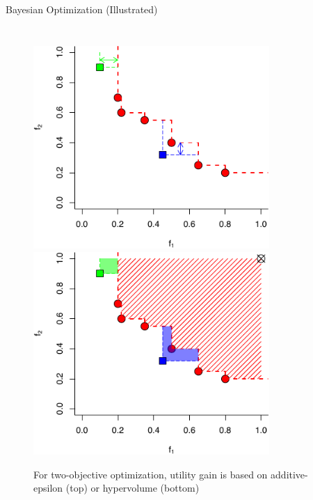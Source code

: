 \begin{frame}{Bayesian Optimization (Illustrated)}
\begin{columns}
    \begin{figure}
      \centering
      \includegraphics[width=0.8\textwidth]{figures/serving-bo-2d-1.pdf} \\
      \includegraphics[width=0.8\textwidth]{figures/serving-bo-2d-2.pdf}
      \caption{For two-objective optimization, utility gain is based on
        additive-epsilon (top) or hypervolume (bottom)~\cite{binoisgpareto}}
    \end{figure}
  \end{columns}
\end{frame}

